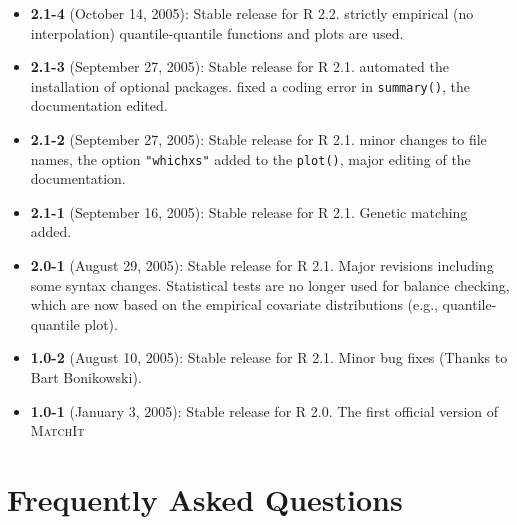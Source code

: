 \documentclass[oneside,letterpaper,12pt]{book}
\newcommand{\MatchIt}{\textsc{MatchIt}}
\begin{document}
\begin{itemize}
\item \textbf{2.1-4} (October 14, 2005): Stable release for R 2.2.
  strictly empirical (no interpolation) quantile-quantile functions
  and plots are used.
\item \textbf{2.1-3} (September 27, 2005): Stable release for R 2.1.
  automated the installation of optional packages. fixed a coding
  error in {\tt summary()}, the documentation edited.
\item \textbf{2.1-2} (September 27, 2005): Stable release for R 2.1.
  minor changes to file names, the option {\tt "whichxs"} added to the
  {\tt plot()}, major editing of the documentation.
\item \textbf{2.1-1} (September 16, 2005): Stable release for R
        2.1. Genetic matching added.    
\item \textbf{2.0-1} (August 29, 2005): Stable release for R 2.1.
  Major revisions including some syntax changes. Statistical tests are
  no longer used for balance checking, which are now based on the
  empirical covariate distributions (e.g., quantile-quantile plot).
\item \textbf{1.0-2} (August 10, 2005): Stable release for R
  2.1. Minor bug fixes (Thanks to Bart Bonikowski).
\item \textbf{1.0-1} (January 3, 2005): Stable release for R 2.0. The
  first official version of \MatchIt
\end{itemize}



\section{Frequently Asked Questions}

%
\end{document}
